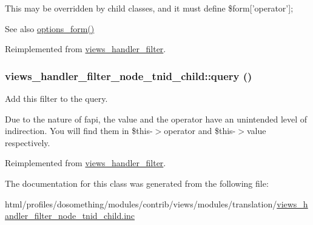 This may be overridden by child classes, and it must define \$form\mbox{[}'operator'\mbox{]};

\begin{DoxySeeAlso}{See also}
\hyperlink{classviews__handler__filter_af14c69367162057a32709a6340de0988}{options\_\-form()} 
\end{DoxySeeAlso}


Reimplemented from \hyperlink{classviews__handler__filter_a8c77c0a8bba8c3ceceae8950fc7b1121}{views\_\-handler\_\-filter}.\hypertarget{classviews__handler__filter__node__tnid__child_aa21b64d11f0f79a113be65b65e6249e0}{
\subsubsection[{query}]{\setlength{\rightskip}{0pt plus 5cm}views\_\-handler\_\-filter\_\-node\_\-tnid\_\-child::query ()}}
\label{classviews__handler__filter__node__tnid__child_aa21b64d11f0f79a113be65b65e6249e0}
Add this filter to the query.

Due to the nature of fapi, the value and the operator have an unintended level of indirection. You will find them in \$this-\/$>$operator and \$this-\/$>$value respectively. 

Reimplemented from \hyperlink{classviews__handler__filter_a8e513b3abbc2559f37b550ca4957b4ae}{views\_\-handler\_\-filter}.

The documentation for this class was generated from the following file:\begin{DoxyCompactItemize}
\item 
html/profiles/dosomething/modules/contrib/views/modules/translation/\hyperlink{views__handler__filter__node__tnid__child_8inc}{views\_\-handler\_\-filter\_\-node\_\-tnid\_\-child.inc}\end{DoxyCompactItemize}
